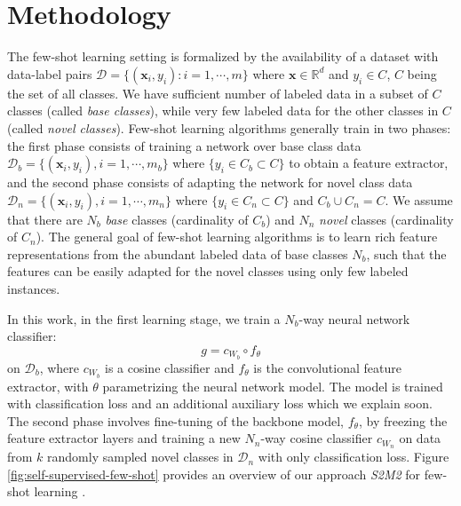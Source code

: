 \documentclass[10pt,twocolumn,letterpaper]{article}
\begin{document}
\section{Methodology}\label{methodology}
\vspace{-3pt}
The few-shot learning setting is formalized by the availability of a dataset with data-label pairs $\mathcal{D} = \{(\textbf{x}_i,y_i): i=1,\cdots,m\}$ where $\textbf{x} \in \mathbb{R}^d$ and $y_i \in C$, $C$ being the set of all classes. We have sufficient number of labeled data in a subset of $C$ classes (called \textit{base classes}), while very few labeled data for the other classes in $C$ (called \textit{novel classes}).
Few-shot learning algorithms generally train in two phases: the first phase consists of training a network over base class data $\mathcal{D}_b=\{(\textbf{x}_i,y_i), i=1,\cdots,m_b\}$ where $\{y_i \in C_b \subset C\}$ to obtain a feature extractor, and the second phase consists of adapting the network for novel class data $\mathcal{D}_n=\{(\textbf{x}_i,y_i), i=1,\cdots,m_n\}$ where $\{y_i \in C_n \subset C\}$ and $C_b \cup C_n = C$. We assume that there are $N_b$ \textit{base} classes (cardinality of $C_b$) and $N_n$ \textit{novel} classes (cardinality of $C_n$). The general goal of few-shot learning algorithms is to learn rich feature representations from the abundant labeled data of base classes $N_b$, such that the features can be easily adapted for the novel classes using only few labeled instances.

In this work, in the first learning stage, we train a $N_{b}$-way neural network classifier:
\begin{equation}
g = c_{W_b} \circ f_{\theta} 
\label{eqn_nn_model}
\end{equation}
on $\mathcal{D}_b$, where $c_{W_b}$ is a cosine classifier \cite{fewshot2018cc,fewshot2018cc2} and $f_{\theta}$ is the convolutional feature extractor, with $\theta$ parametrizing the neural network model. The model is trained with classification loss and an additional auxiliary loss which we explain soon. The second phase involves fine-tuning of the backbone model, $f_{\theta}$, by freezing the feature extractor layers and training a new $N_n$-way cosine classifier $c_{W_n}$ on data from $k$ randomly sampled novel classes in $\mathcal{D}_n$ with only classification loss. Figure \ref{fig:self-supervised-few-shot} provides an overview of our approach \textit{S2M2} for few-shot learning .
\end{document}

